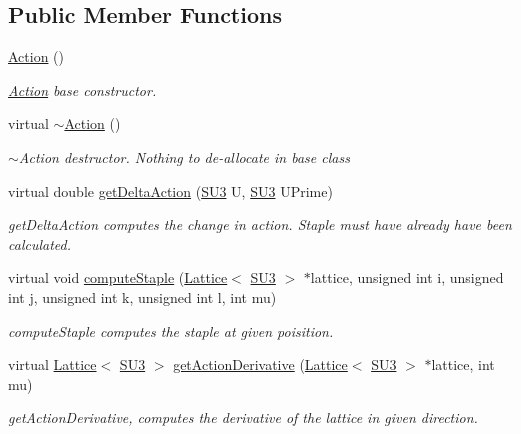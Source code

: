 \subsection*{Public Member Functions}
\begin{DoxyCompactItemize}
\item 
\mbox{\hyperlink{class_action_a4f457ccfc8336b565cadca56b36e0271}{Action}} ()
\begin{DoxyCompactList}\small\item\em \mbox{\hyperlink{class_action}{Action}} base constructor. \end{DoxyCompactList}\item 
virtual \mbox{\hyperlink{class_action_acdb06775d157339256a8ecd55749226c}{$\sim$\+Action}} ()
\begin{DoxyCompactList}\small\item\em $\sim$\+Action destructor. Nothing to de-\/allocate in base class \end{DoxyCompactList}\item 
virtual double \mbox{\hyperlink{class_action_a9409aad86cbfe3b6ec25bf5a837eaea5}{get\+Delta\+Action}} (\mbox{\hyperlink{class_s_u3}{S\+U3}} U, \mbox{\hyperlink{class_s_u3}{S\+U3}} U\+Prime)
\begin{DoxyCompactList}\small\item\em get\+Delta\+Action computes the change in action. Staple must have already have been calculated. \end{DoxyCompactList}\item 
virtual void \mbox{\hyperlink{class_action_a2d5a64b47a8913955e5911ca072ff80d}{compute\+Staple}} (\mbox{\hyperlink{class_lattice}{Lattice}}$<$ \mbox{\hyperlink{class_s_u3}{S\+U3}} $>$ $\ast$lattice, unsigned int i, unsigned int j, unsigned int k, unsigned int l, int mu)
\begin{DoxyCompactList}\small\item\em compute\+Staple computes the staple at given poisition. \end{DoxyCompactList}\item 
virtual \mbox{\hyperlink{class_lattice}{Lattice}}$<$ \mbox{\hyperlink{class_s_u3}{S\+U3}} $>$ \mbox{\hyperlink{class_action_a78168dd7c3819a3365e28fc1aae1b9b6}{get\+Action\+Derivative}} (\mbox{\hyperlink{class_lattice}{Lattice}}$<$ \mbox{\hyperlink{class_s_u3}{S\+U3}} $>$ $\ast$lattice, int mu)
\begin{DoxyCompactList}\small\item\em get\+Action\+Derivative, computes the derivative of the lattice in given direction. \end{DoxyCompactList}\end{DoxyCompactItemize}
